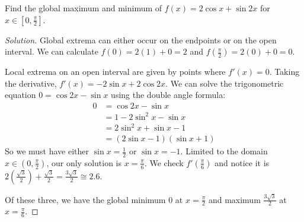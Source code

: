 \question Find the global maximum and minimum of $f(x)=2\cos x + \sin 2x$ for $x \in [0,\frac\pi2]$.
\begin{proof}[Solution]
  Global extrema can either occur on the endpoints or on the open interval.
  We can calculate $f(0) = 2(1)+0 = 2$ and $f(\frac\pi2) = 2(0) + 0 = 0$.

  Local extrema on an open interval are given by points where $f'(x)=0$.
  Taking the derivative, $f'(x) = -2\sin x + 2\cos 2x$.
  We can solve the trigonometric equation $0 = \cos 2x - \sin x$ using the double angle formula:
  \begin{align*}
    0 & = \cos 2x - \sin x          \\
      & = 1 - 2\sin^2 x - \sin x    \\
      & = 2\sin^2 x + \sin x - 1    \\
      & = (2\sin x - 1)(\sin x + 1)
  \end{align*}
  So we must have either $\sin x = \frac12$ or $\sin x = -1$.
  Limited to the domain $x\in(0, \frac\pi2)$, our only solution is $x = \frac\pi6$.
  We check $f'(\frac\pi6)$ and notice it is
  $2(\frac{\sqrt{3}}{2}) + \frac{\sqrt{3}}{2} = \frac{3\sqrt{3}}{2} \cong 2.6$.

  Of these three, we have the global minimum $0$ at $x=\frac\pi2$
  and maximum $\frac{3\sqrt{3}}{2}$ at $x=\frac\pi6$.
\end{proof}


